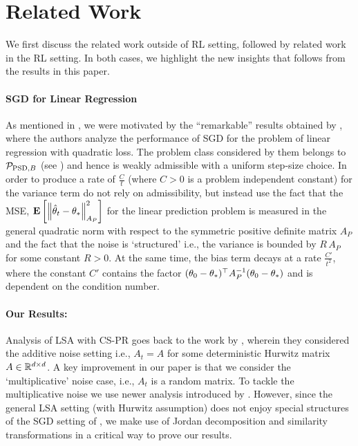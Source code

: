 \section{Related Work}\label{sec:related}
We first discuss the related work outside of RL setting, followed by related work in the RL setting. In both cases, we highlight the new insights that follows from the results in this paper.\par
\paragraph{SGD for Linear Regression} As mentioned in , we were motivated by the ``remarkable'' results obtained by \citet{bach}, where the authors analyze the performance of SGD for the problem of linear regression with quadratic loss. The problem class considered by them belongs to $\P_{\text{PSD},B}$ (see  ) and hence is weakly admissible with a uniform step-size choice. In order to produce a rate of $\frac{C}{t}$ (where $C>0$ is a problem independent constant) for the variance term \citet{bach} do not rely on admissibility, but instead use the fact that the MSE, $\EE{\norm{\thh_t-\ts}^2_{A_P}}$ for the linear prediction problem is measured in the general quadratic norm with respect to the symmetric positive definite matrix $A_P$ and the fact that the noise is `structured' i.e., the variance is bounded by $R\,A_P$ for some constant $R>0$. At the same time, the bias term decays at a rate $\frac{C'}{t^2}$, where the constant $C'$ contains the factor $(\theta_0-\ts)^\top A^{-1}_P (\theta_0-\ts)$ and is dependent on the condition number.
\paragraph{Our Results:} Analysis of LSA with CS-PR goes back to the work by \citet{polyak-judisky}, wherein they considered the additive noise setting i.e., $A_t=A$ for some deterministic Hurwitz matrix $A\in \R^{\dcd}$.
A key improvement in our paper is that we consider the `multiplicative' noise case, i.e., $A_t$ is a random matrix. To tackle the multiplicative noise we use newer analysis introduced by \citet{bach}. However, since the general LSA setting (with Hurwitz assumption) does not enjoy special structures of the SGD setting of \citet{bach}, we make use of Jordan decomposition and similarity transformations in a critical way to prove our results.
